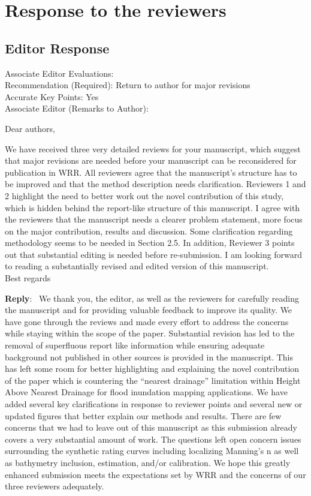 \documentclass[11pt]{article}
\newcounter{reviewer}
\newcounter{point}[reviewer]
\newenvironment{reply}
   {\medskip \noindent \begin{sf}\textbf{Reply}:\  }
   {\medskip \end{sf}}
\begin{document}
\section*{Response to the reviewers}

\subsection*{Editor Response}

Associate Editor Evaluations: \\
Recommendation (Required): Return to author for major revisions \\
Accurate Key Points: Yes \\
\noindent
Associate Editor (Remarks to Author): 

Dear authors,

We have received three very detailed reviews for your manuscript, which suggest that major revisions are needed before your manuscript can be reconsidered for publication in WRR.
All reviewers agree that the manuscript's structure has to be improved and that the method description needs clarification.
Reviewers 1 and 2 highlight the need to better work out the novel contribution of this study, which is hidden behind the report-like structure of this manuscript.
I agree with the reviewers that the manuscript needs a clearer problem statement, more focus on the major contribution, results and discussion.
Some clarification regarding methodology seems to be needed in Section 2.5.
In addition, Reviewer 3 points out that substantial editing is needed before re-submission.
I am looking forward to reading a substantially revised and edited version of this manuscript.\\

Best regards

\begin{reply}
We thank you, the editor, as well as the reviewers for carefully reading the manuscript and for providing valuable feedback to improve its quality.
We have gone through the reviews and made every effort to address the concerns while staying within the scope of the paper.
Substantial revision has led to the removal of superfluous report like information while ensuring adequate background not published in other sources is provided in the manuscript.
This has left some room for better highlighting and explaining the novel contribution of the paper which is countering the ``nearest drainage'' limitation within Height Above Nearest Drainage for flood inundation mapping applications.
We have added several key clarifications in response to reviewer points and several new or updated figures that better explain our methods and results.
There are few concerns that we had to leave out of this manuscript as this submission already covers a very substantial amount of work.
The questions left open concern issues surrounding the synthetic rating curves including localizing Manning's n as well as bathymetry inclusion, estimation, and/or calibration.
We hope this greatly enhanced submission meets the expectations set by WRR and the concerns of our three reviewers adequately.
\end{reply}
\end{document}
